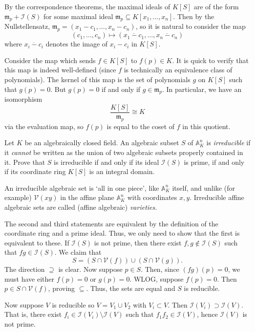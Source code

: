\documentclass[../../master.tex]{subfiles}
\begin{document}
\begin{solution}
    By the correspondence theorems, the maximal ideals of $K[S]$ are of the form $\mathfrak{m}_p + \mathscr{I}(S)$ for some maximal ideal $\mathfrak{m}_p \subseteq K[x_1, \ldots, x_n]$.
    Then by the Nullstellensatz, $\mathfrak{m}_p = (x_1 - c_1, \ldots, x_n - c_n)$, so it is natural to consider the map
    \[
        (c_1, \ldots, c_n) \mapsto (\overline{x_1 - c_1}, \ldots, \overline{x_n - c_n})
    \]
    where $\overline{x_i - c_i}$ denotes the image of $x_i - c_i$ in $K[S]$.

    Consider the map which sends $f \in K[S]$ to $f(p) \in K$.
    It is quick to verify that this map is indeed well-defined (since $f$ is technically an equivalence class of polynomials).
    The kernel of this map is the set of polynomials $g$ on $K[S]$ such that $g(p) = 0$.
    But $g(p) = 0$ if and only if $g \in \mathfrak{m}_p$.
    In particular, we have an isomorphism
    \[
        \frac{K[S]}{\mathfrak{m}_p} \cong K
    \]
    via the evaluation map, so $f(p)$ is equal to the coset of $f$ in this quotient.
\end{solution}

\begin{problem}
    Let $K$ be an algebraically closed field.
    An algebraic subset $S$ of $\mathbb{A}^{n}_K$ is \textit{irreducible} if it \textit{cannot} be written as the union of two algebraic subsets properly contained in it.
    Prove that $S$ is irreducible if and only if its ideal $\mathscr{I}(S)$ is prime, if and only if its coordinate ring $K[S]$ is an integral domain.

    An irreducible algebraic set is `all in one piece', like $\mathbb{A}^{n}_K$ itself, and unlike (for example) $\mathscr{V}(xy)$ in the affine plane $\mathbb{A}^{n}_K$ with coordinates $x, y$.
    Irreducible affine algebraic sets are called (affine algebraic) \textit{varieties}.
\end{problem}

\begin{solution}
    The second and third statements are equivalent by the definition of the coordinate ring and a prime ideal.
    Thus, we only need to show that the first is equivalent to these.
    If $\mathscr{I}(S)$ is not prime, then there exist $f, g \notin \mathscr{I}(S)$ such that $fg \in \mathscr{I}(S)$.
    We claim that
    \[
        S = (S \cap \mathscr{V}(f)) \cup (S \cap \mathscr{V}(g)).
    \]
    The direction $\supseteq$ is clear.
    Now suppose $p \in S$.
    Then, since $(fg)(p) = 0$, we must have either $f(p) = 0$ or $g(p) = 0$.
    WLOG, suppose $f(p) = 0$.
    Then $p \in S \cap \mathscr{V}(f)$, proving $\subseteq$.
    Thus, the sets are equal and $S$ is reducible.

    Now suppose $V$ is reducible so $V = V_1 \cup V_2$ with $V_i \subset V$.
    Then $\mathscr{I}(V_i) \supset \mathscr{I}(V)$.
    That is, there exist $f_i \in \mathscr{I}(V_i) \setminus \mathscr{I}(V)$ such that $f_1 f_2 \in \mathscr{I}(V)$, hence $\mathscr{I}(V)$ is not prime.
\end{solution}
\end{document}
